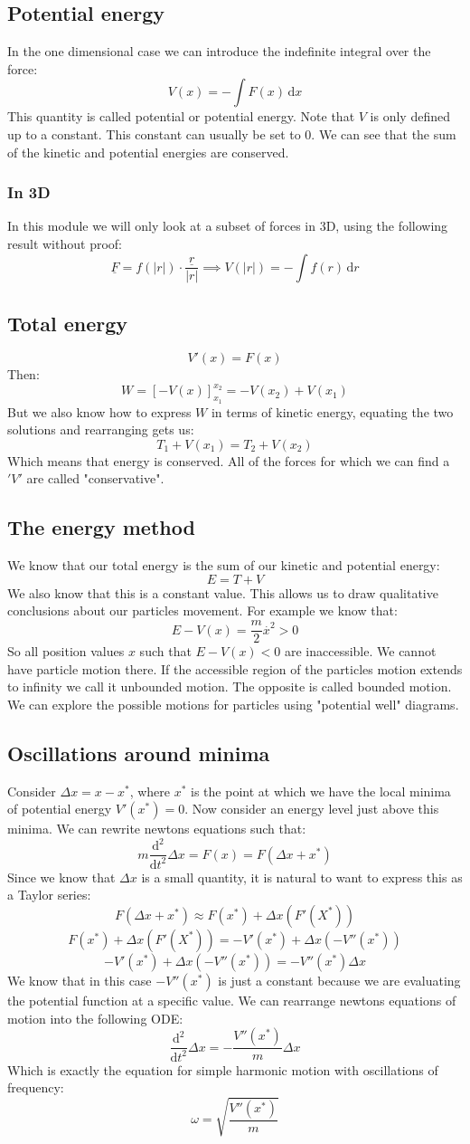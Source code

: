 \documentclass[12pt]{article}
\newcommand{\df}[2]{\frac{\text{d}#1}{\text{d}#2}}
\begin{document}
\subsection*{Potential energy}
In the one dimensional case we can introduce the indefinite integral over the force:
\[V(x)=-\int F(x)\,\text{d}x\]
This quantity is called potential or potential energy. Note that \(V\) is only defined up to a constant. This constant can usually be set to 0. We can see that the sum of the kinetic and potential energies are conserved.
\subsubsection*{In 3D}
In this module we will only look at a subset of forces in 3D, using the following result without proof:
\[\underline{F}=f(|r|)\cdot\frac{\underline{r}}{|r|}\implies V(|r|)=-\int f(r)\,\text{d}r\]
\subsection*{Total energy}
\[V'(x)=F(x)\]
Then:
\[W=\left[-V(x)\right]^{x_2}_{x_1}=-V(x_2)+V(x_1)\]
But we also know how to express \(W\) in terms of kinetic energy, equating the two solutions and rearranging gets us:
\[T_1+V(x_1)=T_2+V(x_2)\]
Which means that energy is conserved. All of the forces for which we can find a \('V'\) are called "conservative". 
\subsection*{The energy method}
We know that our total energy is the sum of our kinetic and potential energy:
\[E=T+V\]
We also know that this is a constant value. This allows us to draw qualitative conclusions about our particles movement. For example we know that:
\[E-V(x)=\frac{m}{2}\overset{.}{x}^2>0\]
So all position values \(x\) such that \(E-V(x)<0\) are inaccessible. We cannot have particle motion there. If the accessible region of the particles motion extends to infinity we call it unbounded motion. The opposite is called bounded motion. We can explore the possible motions for particles using "potential well" diagrams.
\subsection*{Oscillations around minima}
Consider \(\Delta x=x-x^*\), where \(x^*\) is the point at which we have the local minima of potential energy \(V'(x^*)=0\). Now consider an energy level just above this minima. We can rewrite newtons equations such that:
\[m\df{^2}{t^2}\Delta x=F(x)=F(\Delta x+x^*)\]
Since we know that \(\Delta x\) is a small quantity, it is natural to want to express this as a Taylor series:
\[F(\Delta x+x^*)\approx F(x^*)+\Delta x(F'(X^*))\]
\[F(x^*)+\Delta x(F'(X^*))=-V'(x^*)+\Delta x(-V''(x^*))\]
\[-V'(x^*)+\Delta x(-V''(x^*))=-V''(x^*)\Delta x\]
We know that in this case \(-V''(x^*)\) is just a constant because we are evaluating the potential function at a specific value. We can rearrange newtons equations of motion into the following ODE:
\[\df{^2}{t^2}\Delta x=-\frac{V''(x^*)}{m}\Delta x\]
Which is exactly the equation for simple harmonic motion with oscillations of frequency:
\[\omega=\sqrt{\frac{V''(x^*)}{m}}\]
\end{document}
